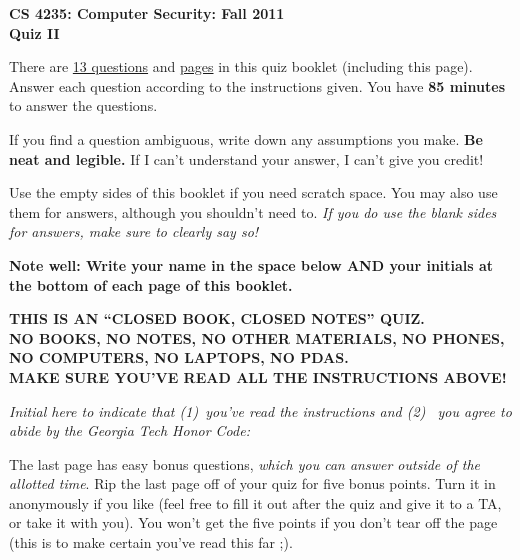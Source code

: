 \documentclass[11pt]{article}
\newcounter{answer}
\begin{document}
\begin{center}
{\Large{\bf CS 4235: Computer Security: Fall 2011} \\
 \vspace{.15in} \Huge{\bf Quiz II}} 
\vspace{.2in}

\begin{boxedminipage}[h]{6in}
There are \underline{13 questions} and
  \underline{\pageref{lastpage} pages} in this quiz booklet (including
  this page).  Answer each question according to the instructions given.
  You have {\bf 85 minutes} to answer the questions.



\vspace{.1in} 
If you find a question ambiguous, write down any
assumptions you make.  {\bf Be neat and legible.}  If I can't
understand your answer, I can't give you credit!  

\vspace{.1in} 
Use the empty sides of this booklet if you need scratch space.  You
may also use them for answers, although you shouldn't need to.  {\em If you
do use the blank sides for answers, make sure to clearly say so!}

\vspace{.1in} 
{\bf Note well: Write your name in the space below AND your initials at the bottom of each
page of this booklet.}

\begin{center}{\bf THIS IS AN ``CLOSED BOOK, CLOSED NOTES'' QUIZ.\\
NO BOOKS, NO NOTES, NO OTHER MATERIALS, NO PHONES, NO COMPUTERS, NO
LAPTOPS, NO PDAS.\\ 
MAKE SURE YOU'VE READ ALL THE INSTRUCTIONS ABOVE!}
\end{center}
{\em Initial here to indicate that (1)~you've read the instructions and (2)~
you agree to abide by the Georgia Tech Honor Code: }



\vspace{.05in} The last page has easy bonus questions, {\em which you can
answer outside of the allotted time}.  Rip the last page off of your
quiz for five bonus points.  Turn it in anonymously if you like (feel
free to fill it out after the quiz and give it to a TA, or take it with you).  You
won't get the five points if you don't tear off the page (this is to
make certain you've read this far ;).
\fi 

\end{boxedminipage}
\end{center}
\end{document}
